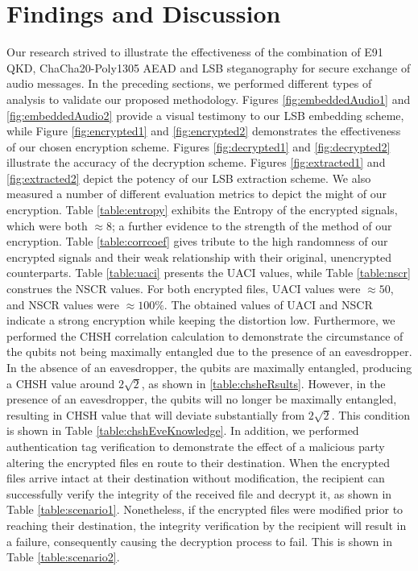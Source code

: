 \documentclass[a4paper]{cas-sc}
\begin{document}
\section{Findings and Discussion}
\label{sec:discussion}
Our research strived to illustrate the effectiveness of the combination of E91 QKD, ChaCha20-Poly1305 AEAD and LSB steganography for secure exchange of audio messages. In the preceding sections, we performed different types of analysis to validate our proposed methodology. Figures \ref{fig:embeddedAudio1} and \ref{fig:embeddedAudio2} provide a visual testimony to our LSB embedding scheme, while Figure \ref{fig:encrypted1} and \ref{fig:encrypted2} demonstrates the effectiveness of our chosen encryption scheme. Figures \ref{fig:decrypted1} and \ref{fig:decrypted2} illustrate the accuracy of the decryption scheme. Figures \ref{fig:extracted1} and \ref{fig:extracted2} depict the potency of our LSB extraction scheme. We also measured a number of different evaluation metrics to depict the might of our encryption. Table \ref{table:entropy} exhibits the Entropy of the encrypted signals, which were both $\approx8$; a further evidence to the strength of the method of our encryption. Table \ref{table:corrcoef} gives tribute to the high randomness of our encrypted signals and their weak relationship with their original, unencrypted counterparts. Table \ref{table:uaci} presents the UACI values, while Table \ref{table:nscr} construes the NSCR values. For both encrypted files, UACI values were $\approx50$, and NSCR values were $\approx100\%$. The obtained values of UACI and NSCR indicate a strong encryption while keeping the distortion low. Furthermore, we performed the CHSH correlation calculation to demonstrate the circumstance of the qubits not being maximally entangled due to the presence of an eavesdropper. In the absence of an eavesdropper, the qubits are maximally entangled, producing a CHSH value around $2\sqrt{2}$, as shown in \ref{table:chsheRsults}. However, in the presence of an eavesdropper, the qubits will no longer be maximally entangled, resulting in CHSH value that will deviate substantially from $2\sqrt{2}$. This condition is shown in Table \ref{table:chshEveKnowledge}. In addition, we performed authentication tag verification to demonstrate the effect of a malicious party altering the encrypted files en route to their destination. When the encrypted files arrive intact at their destination without modification, the recipient can successfully verify the integrity of the received file and decrypt it, as shown in Table \ref{table:scenario1}. Nonetheless, if the encrypted files were modified prior to reaching their destination, the integrity verification by the recipient will result in a failure, consequently causing the decryption process to fail. This is shown in Table \ref{table:scenario2}.
\end{document}
